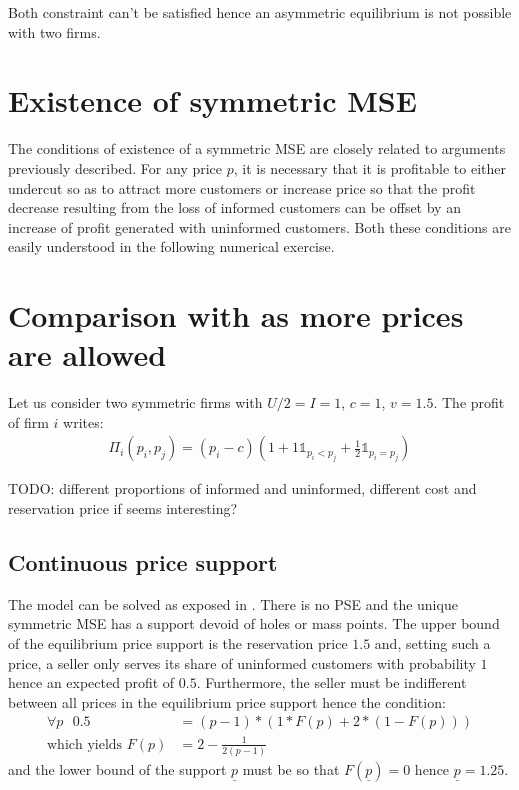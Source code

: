 \documentclass[11pt]{article}
\begin{document}
Both constraint can't be satisfied hence an asymmetric equilibrium is not possible with two firms.

\section{Existence of symmetric MSE}

The conditions of existence of a symmetric MSE are closely related to arguments previously described. For any price $p$, it is necessary that it is profitable to either undercut so as to attract more customers or increase price so that the profit decrease resulting from the loss of informed customers can be offset by an increase of profit generated with uninformed customers. Both these conditions are easily understood in the following numerical exercise.

\section{Comparison with \cite{VAR80} as more prices are allowed}

Let us consider two symmetric firms with $U/2 = I = 1$, $c=1$, $v=1.5$. The profit of firm $i$ writes:
\begin{align*}
\Pi_i(p_i, p_j) = (p_i - c) (1 + 1 \mathbb{1}_{p_i < p_j} + \frac{1}{2} \mathbb{1}_{p_i = p_j})
\end{align*}

TODO: different proportions of informed and uninformed, different cost and reservation price if seems interesting?

\subsection{Continuous price support}

The model can be solved as exposed in \cite{VAR80}. There is no PSE and the unique symmetric MSE has a support devoid of holes or mass points. The upper bound of the equilibrium price support is the reservation price $1.5$ and, setting such a price, a seller only serves its share of uninformed customers with probability $1$ hence an expected profit of $0.5$. Furthermore, the seller must be indifferent between all prices in the equilibrium price support hence the condition:
\begin{align*}
\forall p \text{ } 0.5 & = (p-1) * (1*F(p) + 2*(1-F(p))) \\
\text{which yields } F(p) & = 2 - \frac{1}{2(p-1)}
\end{align*}
and the lower bound of the support $\underline{p}$ must be so that $F(\underline{p})=0$ hence $\underline{p}=1.25$.
\end{document}
